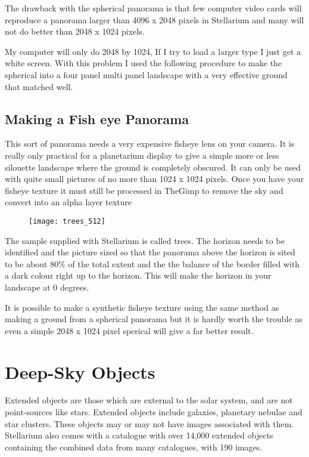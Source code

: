 The drawback with the spherical panorama is that few computer video
cards will reproduce a panorama larger than 4096 x 2048 pixels in
Stellarium and many will not do better than 2048 x 1024 pixels.

My computer will only do 2048 by 1024, If I try to load a larger type I
just get a white screen. With this problem I used the following
procedure to make the spherical into a four panel multi panel landscape
with a very effective ground that matched well.

\section{Making a Fish eye
Panorama}\label{making-a-fish-eye-panorama}

This sort of panorama needs a very expensive fisheye lens on your
camera. It is really only practical for a planetarium display to give a
simple more or less silouette landscape where the ground is completely
obscured. It can only be used with quite small pictures of no more than
1024 x 1024 pixels. Once you have your fisheye texture it must still be
processed in TheGimp to remove the sky and convert into an alpha layer
texture

\begin{figure}[h]
\centering\texttt{[image: trees\_512]}
\end{figure}

The sample supplied with Stellarium is called trees. The horizon needs
to be identified and the picture sized so that the panorama above the
horizon is sited to be about 80\% of the total extent and the the
balance of the border filled with a dark colour right up to the horizon.
This will make the horizon in your landscape at 0 degrees.

It is possible to make a synthetic fisheye texture using the same method
as making a ground from a spherical panorama but it is hardly worth the
trouble as even a simple 2048 x 1024 pixel sperical will give a far
better result.

\chapter{Deep-Sky Objects}\label{deep-sky-objects}

Extended objects are those which are external to the solar system, and
are not point-sources like stars. Extended objects include galaxies,
planetary nebulae and star clusters. These objects may or may not have
images associated with them. Stellarium also comes with a catalogue with
over 14,000 extended objects containing the combined data from many
catalogues, with 190 images.

